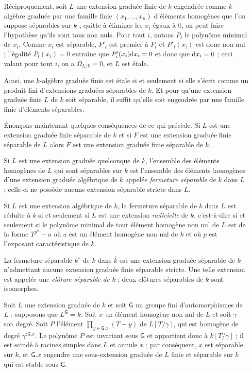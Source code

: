 \documentclass[10pt,leqno]{article}
\newcommand{\deux}[1]{\refstepcounter{subsection}\label{#1}\medskip\noindent {\bf (\thesubsection)}\hspace{.1cm}}
\newcommand{\trois}[1]{\refstepcounter{subsubsection}\label{#1}\medskip\noindent {\bf
    (\thesubsubsection)}\hspace{.1cm}}
\begin{document}
\medskip
Réciproquement, soit $ L$ une extension graduée finie de $ k$ engendrée comme $ k$-algèbre graduée par une famille finie $(x_1,\ldots, x_n)$ d'éléments homogènes que l'on suppose séparables sur $k$ ; quitte à éliminer les $x_i$ égaux à $0$, on peut faire l'hypothèse qu'ils sont tous non nuls. Pour tout $i$, notons $P_i$ le polynôme minimal de $x_i$. Comme $x_i$ est séparable, $P'_i$ est premier à $P_i$ et $P'_i(x_i)$ est donc non nul ; l'égalité $P_i(x_i)=0$ entraîne que $P'_i(x_i){\rm d}x_i=0$ et donc que ${\rm d}x_i=0$ ; ceci valant pour tout $i$, on a $\Omega_{ L/ k}=0$, et $ L$ est étale. 

\medskip
Ainsi, une $ k$-algèbre graduée finie est étale si et seulement si elle s'écrit comme un produit fini d'extensions graduées séparables de $ k$. Et pour qu'une extension graduée finie $ L$ de $ k$ soit séparable, il suffit qu'elle soit engendrée par une famille finie d'éléments séparables. 


\trois{fermesp} Énonçons maintenant quelques conséquences de ce qui précède. Si $ L$ est une extension graduée finie séparable de $ k$ et si $ F$ est une extension graduée finie séparable de $ L$ alors $ F$ est une extension graduée finie séparable de $ k$. 

Si $ L$ est une extension graduée quelconque de $ k$, l'ensemble des éléments homogènes de $ L$ qui sont séparables sur $ k$ est l'ensemble des éléments homogènes d'une extension graduée algébrique de $ k$ appelée {\em fermeture séparable} de $ k$ dans $ L$ ; celle-ci ne possède aucune extension séparable stricte dans $ L$.

Si $ L$ est une extension algébrique de $ k$, la fermeture séparable de $ k$ dans $ L$ est réduite à $ k$ si et seulement si $ L$ est une extension {\em radicielle} de $ k$, c'est-à-dire si et seulement si le polynôme minimal de tout élément homogène non nul de $ L$ est de la forme $T^{p^n}-a$ où $a$ est un élément homogène non nul de $ k$ et où $p$ est l'exposant caractéristique de $ k$. 


\medskip
La fermeture séparable $ k^s$ de $ k$ dans $\overline { k}$ est une extension graduée séparable de $ k$ n'admettant aucune extension graduée finie séparable stricte. Une telle extension est appelée une {\em clôture séparable de $ k$} ; deux clôtures séparables de $ k$ sont isomorphes. 

\deux{autfixe} Soit $ L$ une extension graduée de $ k$ et soit $\mathsf G$ un groupe fini d'automorphismes de $ L$ ; supposons que $L^{\mathsf G}=k$. Soit $x$ un élément homogène non nul de $L$ et soit $\gamma$ son degré. Soit $P$ l'élément $\prod\limits_{y\in \mathsf G.x} (T-y)$ de $L[T/\gamma]$, qui est homogène de degré $\gamma^{\sharp\mathsf G.x}$. Le polynôme $P$ est invariant sous $\mathsf G$ et appartient donc à $k[T/\gamma]$ ; il est scindé à racines simples dans $L$ et annule $x$ ; par conséquent, $x$ est séparable sur $k$, et $\mathsf G.x$ engendre une sous-extension graduée de $L$ finie et séparable sur $k$ qui est stable sous $\mathsf G$. 
\end{document}
